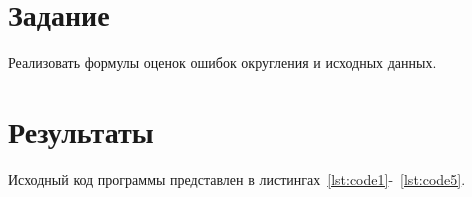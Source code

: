 \documentclass[a4paper, 14pt]{extarticle}
\begin{document}
\renewcommand{\ttdefault}{pcr}

\setlength{\tabcolsep}{3pt}
\newpage
\setcounter{page}{2}

\section{Задание}\label{Sect::task}

Реализовать формулы оценок ошибок округления и исходных данных.

\section{Результаты}\label{Sect::res}

Исходный код программы представлен в листингах~\ref{lst:code1}-~\ref{lst:code5}.
\end{document}
